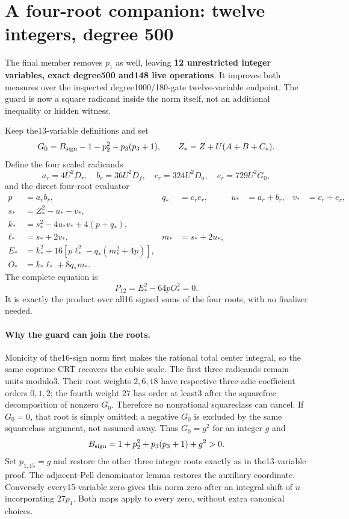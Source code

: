 \section{A four-root companion: twelve integers, degree 500}
\label{sec:four-carrier}
The final member removes $p_1$ as well, leaving \textbf{12 unrestricted
integer variables, exact degree500 and148 live operations}.  It improves
both measures over the inspected degree1000/180-gate twelve-variable
endpoint.  The guard is now a square radicand inside the norm itself,
not an additional inequality or hidden witness.

Keep the13-variable definitions and set
\[
 G_0=B_{\rm sign}-1-p_2^2-p_3(p_3+1),\qquad
 Z_*=Z+U(A+B+C_*).
\]
Define the four scaled radicands
\[
 a_r=4U^2D_\tau,\quad b_r=36U^2D_f,\quad
 c_r=324U^2D_a,\quad e_r=729U^2G_0,
\]
and the direct four-root evaluator
\begin{align*}
 p&=a_rb_r,&q_*&=c_re_r,&u_*&=a_r+b_r,&v_*&=c_r+e_r,\\
 s_*&=Z_*^2-u_*-v_*,\\
 k_*&=s_*^2-4u_*v_*+4(p+q_*),\\
 \ell_*&=s_*+2v_*,&m_*&=s_*+2u_*,\\
 E_*&=k_*^2+16[p\ell_*^2-q_*(m_*^2+4p)],\\
 O_*&=k_*\ell_*+8q_*m_*.
\end{align*}
The complete equation is
\[
 \boxed{P_{12}=E_*^2-64pO_*^2=0.}
\]
It is exactly the product over all16 signed sums of the four roots, with
no finalizer needed.

\paragraph{Why the guard can join the roots.}
Monicity of the16-sign norm first makes the rational total center integral,
so the same coprime CRT recovers the cubic scale.  The first three radicands
remain units modulo3.  Their root weights $2,6,18$ have respective
three-adic coefficient orders $0,1,2$; the fourth weight $27$ has order
at least3 after the squarefree decomposition of nonzero $G_0$.
Therefore no nonrational squareclass can cancel.  If $G_0=0$, that root is
simply omitted; a negative $G_0$ is excluded by the same squareclass argument,
not assumed away.  Thus $G_0=g^2$ for an integer $g$ and
\[
 B_{\rm sign}=1+p_2^2+p_3(p_3+1)+g^2>0.
\]
Set $p_{1,15}=g$ and restore the other three integer roots exactly as in
the13-variable proof.  The adjacent-Pell denominator lemma restores the
auxiliary coordinate.  Conversely every15-variable zero gives this norm
zero after an integral shift of $n$ incorporating $27p_1$.  Both maps apply
to every zero, without extra canonical choices.

